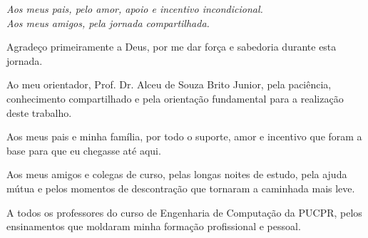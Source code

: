 \documentclass[
	a4paper,      %
	12pt,         %
	english       %
]{abntex2}
\begin{document}


\imprimircapa

\imprimirfolhaderosto

\begin{dedicatoria}
	\vspace*{\fill} %
	\begin{flushright} %
		\textit{Aos meus pais, pelo amor, apoio e incentivo incondicional.\\
		Aos meus amigos, pela jornada compartilhada.}
	\end{flushright}
\end{dedicatoria}

\begin{agradecimentos}
	Agradeço primeiramente a Deus, por me dar força e sabedoria durante esta jornada.

	Ao meu orientador, Prof. Dr. Alceu de Souza Brito Junior, pela paciência, conhecimento compartilhado e pela orientação fundamental para a realização deste trabalho.
	
	Aos meus pais e minha família, por todo o suporte, amor e incentivo que foram a base para que eu chegasse até aqui.
	
	Aos meus amigos e colegas de curso, pelas longas noites de estudo, pela ajuda mútua e pelos momentos de descontração que tornaram a caminhada mais leve.
	
	A todos os professores do curso de Engenharia de Computação da PUCPR, pelos ensinamentos que moldaram minha formação profissional e pessoal.

\end{agradecimentos}

\end{document}

